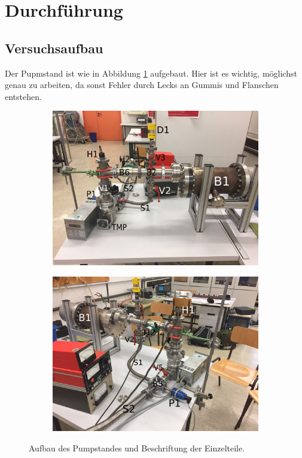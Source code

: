 \section{Durchführung}
\label{sec:Durchführung}

\subsection{Versuchsaufbau}
Der Pupmstand ist wie in Abbildung \ref{fig:Aufbau} aufgebaut. Hier ist es wichtig,
möglichst genau zu arbeiten, da sonst Fehler durch Lecks an Gummis und Flanschen
entstehen.
\begin{figure}
  \begin{subfigure}[c]{0.5\textwidth}
    \includegraphics[width=\textwidth]{IMG_6888.JPG}
  \end{subfigure}
  \begin{subfigure}[c]{0.5\textwidth}
    \includegraphics[width=\textwidth]{IMG_6889.JPG}
  \end{subfigure}
  \caption{Aufbau des Pumpstandes und Beschriftung der Einzelteile.}
  \label{fig:Aufbau}
\end{figure}

